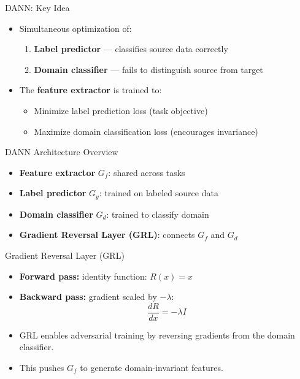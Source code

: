 \documentclass{beamer}
\begin{document}
\begin{frame}{DANN: Key Idea}
\begin{itemize}
    \item Simultaneous optimization of:
    \begin{enumerate}
        \item \textbf{Label predictor} — classifies source data correctly
        \item \textbf{Domain classifier} — fails to distinguish source from target
    \end{enumerate}
    \item The \textbf{feature extractor} is trained to:
    \begin{itemize}
        \item Minimize label prediction loss (task objective)
        \item Maximize domain classification loss (encourages invariance)
    \end{itemize}
\end{itemize}
\end{frame}

\begin{frame}{DANN Architecture Overview}
\begin{itemize}
    \item \textbf{Feature extractor} $G_f$: shared across tasks
    \item \textbf{Label predictor} $G_y$: trained on labeled source data
    \item \textbf{Domain classifier} $G_d$: trained to classify domain
    \item \textbf{Gradient Reversal Layer (GRL)}: connects $G_f$ and $G_d$
\end{itemize}
\end{frame}

\begin{frame}{Gradient Reversal Layer (GRL)}
\begin{itemize}
    \item \textbf{Forward pass:} identity function: $R(x) = x$
    \item \textbf{Backward pass:} gradient scaled by $-\lambda$: 
    \[
    \frac{dR}{dx} = -\lambda I
    \]
    \item GRL enables adversarial training by reversing gradients from the domain classifier.
    \item This pushes $G_f$ to generate domain-invariant features.
\end{itemize}
\end{frame}
\end{document}
